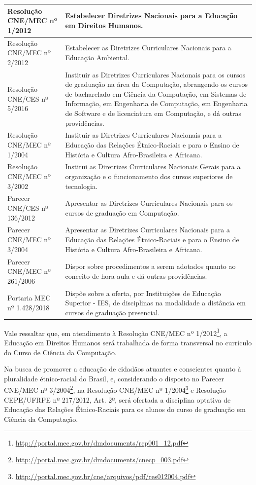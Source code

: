 \documentclass[
	12pt,				%
	openright,			%
  oneside,     %
	a4paper,			%
	english,			%
	french,				%
	spanish,			%
	brazil				%
	]{abntex2}
\begin{document}
\begin{center}
\begin{scriptsize}
\begin{longtable}{@{}lp{8.7cm}}
    Resolução CNE/MEC nº 1/2012 & Estabelecer Diretrizes Nacionais para a Educação em Direitos Humanos.\\ \midrule
    Resolução CNE/MEC nº 2/2012 & Estabelecer as Diretrizes Curriculares Nacionais para a Educação Ambiental. \\ \midrule
    Resolução CNE/CES nº 5/2016	& Instituir as Diretrizes Curriculares Nacionais para os cursos de graduação na área da Computação, abrangendo os cursos de bacharelado em Ciência da Computação, em Sistemas de Informação, em Engenharia de Computação, em Engenharia de Software e de licenciatura em Computação, e dá outras providências.\\ \midrule
    Resolução CNE/MEC nº 1/2004	& Instituir as Diretrizes Curriculares Nacionais para a Educação das Relações Étnico-Raciais e para o Ensino de História e Cultura Afro-Brasileira e Africana. \\ \midrule
    Resolução CNE/MEC nº 3/2002 & Institui	as Diretrizes Curriculares Nacionais Gerais para a organização e o funcionamento dos cursos superiores de tecnologia. \\ \midrule
    Parecer CNE/CES nº 136/2012	& Apresentar as Diretrizes Curriculares Nacionais para os cursos de graduação em Computação. \\ \midrule
    Parecer CNE/MEC nº 3/2004 & Apresentar as Diretrizes Curriculares Nacionais para a Educação das	Relações Étnico-Raciais e para o Ensino de História e Cultura Afro-Brasileira e Africana. \\ \midrule
    Parecer CNE/MEC nº 261/2006	& Dispor sobre procedimentos a serem adotados quanto ao conceito de hora-aula e dá outras providências. \\ \midrule
    Portaria MEC nº 1.428/2018	& Dispõe sobre a oferta, por Instituições de Educação Superior - IES, de disciplinas na modalidade a distância em cursos de graduação presencial. \\
    \bottomrule
    \end{longtable}
\end{scriptsize}      
\end{center}


Vale ressaltar que, em atendimento à Resolução CNE/MEC nº 1/2012\footnote{\url{http://portal.mec.gov.br/dmdocuments/rcp001_12.pdf}}, a Educação em Direitos Humanos será trabalhada de forma transversal no currículo do Curso de Ciência da Computação.

Na busca de promover a educação de cidadãos atuantes e conscientes quanto à pluralidade étnico-racial do Brasil, e, considerando o disposto no Parecer CNE/MEC nº 3/2004\footnote{\url{http://portal.mec.gov.br/dmdocuments/cnecp_003.pdf}}, na Resolução CNE/MEC nº 1/2004\footnote{\url{http://portal.mec.gov.br/cne/arquivos/pdf/res012004.pdf}} e Resolução CEPE/UFRPE nº 217/2012, Art. 2º, será ofertada a disciplina optativa de Educação das Relações Étnico-Raciais para os alunos do curso de graduação em Ciência da Computação.
\end{document}
